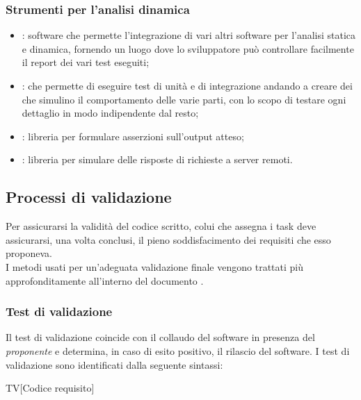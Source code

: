 \subsubsection{Strumenti per l'analisi dinamica}
\begin{itemize}
  \item \textbf{}: software che permette l'integrazione di vari altri software per l'analisi statica e dinamica, fornendo un luogo dove lo sviluppatore può controllare facilmente il report dei vari test eseguiti;
  \item \textbf{}:  che permette di eseguire test di unità e di integrazione andando a creare dei  che simulino il comportamento delle varie parti, con lo scopo di testare ogni dettaglio in modo indipendente dal resto;
  \item \textbf{}: libreria per formulare asserzioni sull'output atteso;
  \item \textbf{}: libreria per simulare delle risposte di richieste a server remoti.

\end{itemize}

\subsection{Processi di validazione}
Per assicurarsi la validità del codice scritto, colui che assegna i task deve assicurarsi, una volta conclusi, il pieno soddisfacimento dei requisiti che esso proponeva. \\
I metodi usati per un'adeguata validazione finale vengono trattati più approfonditamente all'interno del documento \pianoDiQualifica.

\subsubsection{Test di validazione}
Il test di validazione coincide con il collaudo del software in presenza del \textit{proponente} e determina, in caso di esito positivo, il rilascio del software. I test di validazione sono identificati dalla seguente sintassi:
\begin{center}
  TV[Codice requisito]
\end{center}

